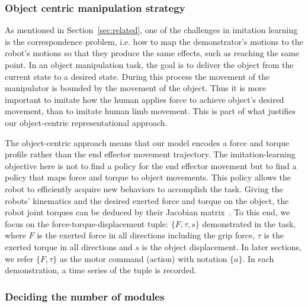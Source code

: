 \subsubsection{Object centric manipulation strategy}
\label{sec:objectlevel}
As mentioned in Section~\ref{sec:related}, one of the challenges in
imitation learning is the correspondence problem, i.e. how to map the
demonstrator's motions to the robot's motions so that they produce the
same effects, such as reaching the same
point. %
In an object manipulation task, the goal is to deliver the object from
the current state to a desired state. During this process the movement
of the manipulator is bounded by the movement of the object. Thus it is
more important to imitate how the human applies force to achieve object's
desired movement, than to imitate human limb movement.  This is part
of what justifies our object-centric representational approach.

The object-centric approach means that our model encodes a force and
torque profile rather than the end effector movement trajectory.  The
imitation-learning objective here is not to find a policy for the end
effector movement but to find a policy that maps force and torque
to object movements. This policy allows the robot to efficiently
acquire new behaviors to accomplish the
task. %
Giving the robots' kinematics and the desired exerted force and torque
on the object, the robot joint torques can be deduced by their Jacobian
matrix~\citep{okamura2000overview}. To this end, we focus on the
force-torque-displacement tuple: $\{F,\tau,s\}$ demonstrated in the
task, where $F$ is the exerted force in all directions including the
grip force, $\tau$ is the exerted torque in all directions and $s$ is
the object displacement. In later sections, we refer $\{F,\tau\}$ as
the motor command (action) with notation $\{a\}$. In each
demonstration, a time series of the tuple is recorded.



\subsubsection{Deciding the number of modules}
\label{sec:cluster}

